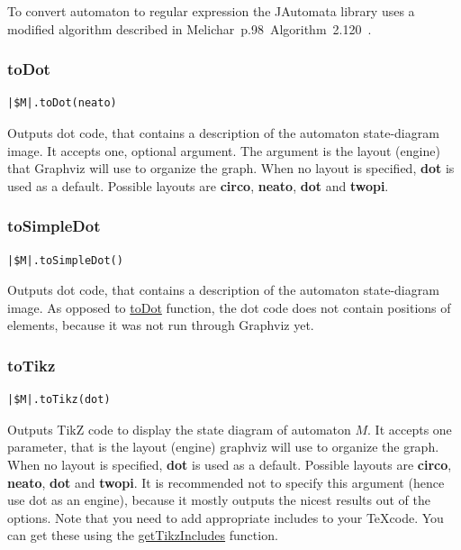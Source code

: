 \documentclass{ctuthesis}
\begin{document}
To convert automaton to regular expression the JAutomata library uses a modified algorithm described in Melichar~p.98~Algorithm~2.120~\cite{melichar}.

\subsubsection{toDot}
\label{subsec:toDot}
\begin{lstlisting}[language = JASL_snippet]
	|$M|.toDot(neato)
\end{lstlisting}

Outputs dot code, that contains a description of the automaton state-diagram image. It accepts one, optional argument. The argument is the layout (engine) that Graphviz will use to organize the graph. When no layout is specified, \textbf{dot} is used as a default. Possible layouts are \textbf{circo}, \textbf{neato}, \textbf{dot} and \textbf{twopi}. 

\subsubsection{toSimpleDot}
\begin{lstlisting}[language = JASL_snippet]
	|$M|.toSimpleDot()
\end{lstlisting}

Outputs dot code, that contains a description of the automaton state-diagram image. As opposed to \hyperref[subsec:toDot]{toDot} function, the dot code does not contain positions of elements, because it was not run through Graphviz yet. 

\subsubsection{toTikz}
\begin{lstlisting}[language = JASL_snippet]
	|$M|.toTikz(dot)
\end{lstlisting}

Outputs TikZ code to display the state diagram of automaton $M$. It accepts one parameter, that is the layout (engine) graphviz will use to organize the graph. When no layout is specified, \textbf{dot} is used as a default. Possible layouts are \textbf{circo}, \textbf{neato}, \textbf{dot} and \textbf{twopi}. It is recommended not to specify this argument (hence use dot as an engine), because it mostly outputs the nicest results out of the options. Note that you need to add appropriate includes to your \TeX code. You can get these using the \hyperref[subsec:getTikzIncludes]{getTikzIncludes} function.
\end{document}
